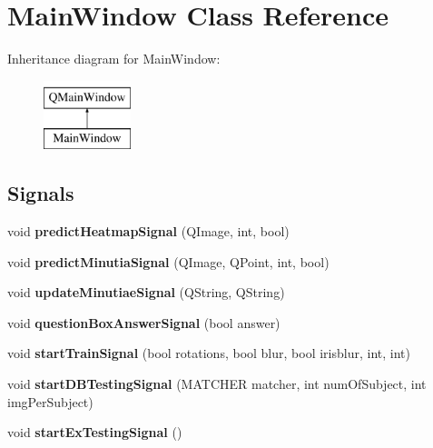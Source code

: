\hypertarget{class_main_window}{}\section{Main\+Window Class Reference}
\label{class_main_window}
Inheritance diagram for Main\+Window\+:\begin{figure}[H]
\begin{center}
\leavevmode
\includegraphics[height=2.000000cm]{class_main_window}
\end{center}
\end{figure}
\subsection*{Signals}
\begin{DoxyCompactItemize}
\item 
\mbox{\label{class_main_window_a828d5b4f19ea34b397dd39821e4300b1}} 
void {\bfseries predict\+Heatmap\+Signal} (Q\+Image, int, bool)
\item 
\mbox{\label{class_main_window_a3a20a15dee2158f9c0c4b1ca42701b94}} 
void {\bfseries predict\+Minutia\+Signal} (Q\+Image, Q\+Point, int, bool)
\item 
\mbox{\label{class_main_window_a7c8c67c09446a70b12427c38d8ea1f8c}} 
void {\bfseries update\+Minutiae\+Signal} (Q\+String, Q\+String)
\item 
\mbox{\label{class_main_window_a37d895b1086da17425e0e367baa13b0e}} 
void {\bfseries question\+Box\+Answer\+Signal} (bool answer)
\item 
\mbox{\label{class_main_window_adfad8162937519e803059f7e1c46e498}} 
void {\bfseries start\+Train\+Signal} (bool rotations, bool blur, bool irisblur, int, int)
\item 
\mbox{\label{class_main_window_a7d725782f5ed8045a272a72e06714094}} 
void {\bfseries start\+D\+B\+Testing\+Signal} (M\+A\+T\+C\+H\+ER matcher, int num\+Of\+Subject, int img\+Per\+Subject)
\item 
\mbox{\label{class_main_window_af9d832227b0e1c62ffa8ae29ad43a711}} 
void {\bfseries start\+Ex\+Testing\+Signal} ()
\end{DoxyCompactItemize}
